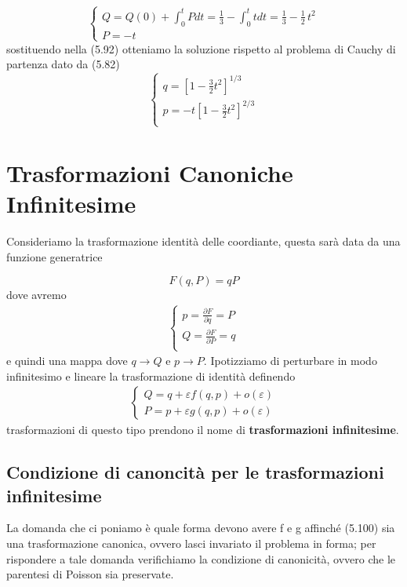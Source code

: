 \begin{equation}
	\begin{cases}
		Q = Q(0) + \int_{0}^{t} Pdt = \frac{1}{3} - \int_{0}^{t} tdt = \frac{1}{3} - \frac{1}{2} \,t^2\\
		P = -t 
	\end{cases}
\end{equation}
sostituendo nella (5.92) otteniamo la soluzione rispetto al problema di Cauchy di partenza dato da (5.82)
\begin{equation}
\begin{cases}
	q = \left[1-\frac{3}{2} t^2\right]^{1 / 3} \\
	p = -t\left[1-\frac{3}{2} t^2\right]^{2 / 3}\\
	\end{cases}
\end{equation}

\section{Trasformazioni Canoniche Infinitesime}

Consideriamo la trasformazione identit\`{a} delle coordiante, questa sar\`{a} data da una funzione generatrice 

\begin{equation}
	F(q,P) = qP
\end{equation}
 dove avremo 
 \begin{align}
 	\begin{cases}
 		p = \frac{\partial F}{\partial q} = P \\
 		Q = \frac{\partial F}{\partial P } = q \\
 	\end{cases}
 \end{align}
e quindi una mappa dove $q \rightarrow Q$ e $p \rightarrow P$.\newline
Ipotizziamo di perturbare in modo infinitesimo e lineare la trasformazione di identit\`{a} definendo
\begin{align}
	\begin{cases}
		Q = q + \varepsilon f(q,p) + o(\varepsilon)\\
		P = p + \varepsilon g(q,p) + o(\varepsilon)
	\end{cases}
\end{align}
trasformazioni di questo tipo prendono il nome di \textbf{trasformazioni infinitesime}. 

\subsection{Condizione di canoncit\`{a} per le trasformazioni infinitesime }
La domanda che ci poniamo \`{e} quale forma devono avere f e g affinch\'{e} (5.100) sia una trasformazione canonica, ovvero lasci invariato il problema in forma; per rispondere a tale domanda verifichiamo la condizione di canonicit\`{a}, ovvero che le parentesi di Poisson sia preservate.


